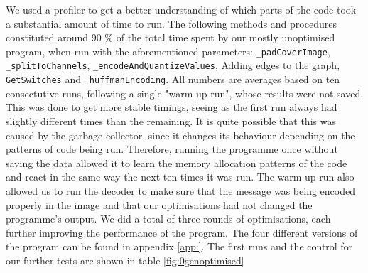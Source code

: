 We used a profiler to get a better understanding of which parts of the code took a substantial amount of time to run.
The following methods and procedures constituted around 90 \% of the total time spent by our mostly unoptimised program, when run with the aforementioned parameters:
\lstinline|_padCoverImage|, \lstinline|_splitToChannels|, \lstinline|_encodeAndQuantizeValues|, Adding edges to the graph, \lstinline|GetSwitches| and \lstinline|_huffmanEncoding|.
All numbers are averages based on ten consectutive runs, following a single "warm-up run", whose results were not saved.
This was done to get more stable timings, seeing as the first run always had slightly different times than the remaining.
It is quite possible that this was caused by the garbage collector, since it changes its behaviour depending on the patterns of code being run.
Therefore, running the programme once without saving the data allowed it to learn the memory allocation patterns of the code and react in the same way the next ten times it was run.
The warm-up run also allowed us to run the decoder to make sure that the message was being encoded properly in the image and that our optimisations had not changed the programme's output.
We did a total of three rounds of optimisations, each further improving the performance of the program.
The four different versions of the program can be found in appendix \ref{app:}.
The first runs and the control for our further tests are shown in table \ref{fig:0genoptimised}

